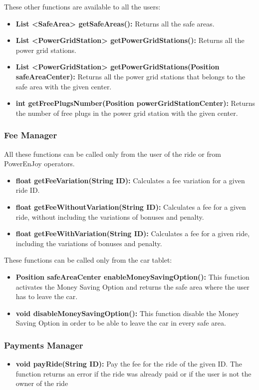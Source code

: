 These other functions are available to all the users:
\begin{itemize}
	\item \textbf{List \textless SafeArea\textgreater{} getSafeAreas():} Returns all the safe areas.
	\item \textbf{List \textless PowerGridStation\textgreater{} getPowerGridStations():} Returns all the power grid stations.
	\item \textbf{List \textless PowerGridStation\textgreater{} getPowerGridStations(Position safeAreaCenter):} Returns all the power grid stations that belongs to the safe area with the given center.
	\item \textbf{int getFreePlugsNumber(Position powerGridStationCenter):} Returns the number of free plugs in the power grid station with the given center.
\end{itemize}

\subsubsection{Fee Manager}
All these functions can be called only from the user of the ride or from PowerEnJoy operators.
\begin{itemize}
	\item \textbf{float getFeeVariation(String ID):} Calculates a fee variation for a given ride ID. 
	\item \textbf{float getFeeWithoutVariation(String ID):} Calculates a fee for a given ride, without including the variations of bonuses and penalty.
	\item \textbf{float getFeeWithVariation(String ID):} Calculates a fee for a given ride, including the variations of bonuses and penalty.
\end{itemize}

These functions can be called only from the car tablet:
\begin{itemize}
	\item \textbf{Position safeAreaCenter enableMoneySavingOption():} This function activates the Money Saving Option and returns the safe area where the user has to leave the car.
	\item \textbf{void disableMoneySavingOption():} This function disable the Money Saving Option in order to be able to leave the car in every safe area.
\end{itemize}

\subsubsection{Payments Manager}
\begin{itemize}
	\item \textbf{void payRide(String ID):} Pay the fee for the ride of the given ID. The function returns an error if the ride was already paid or if the user is not the owner of the ride
\end{itemize}
